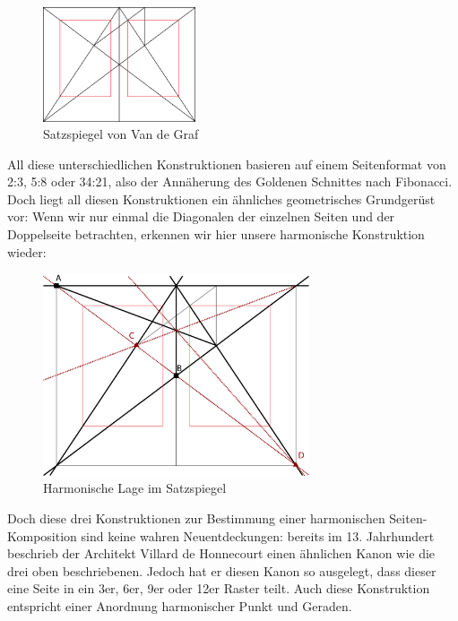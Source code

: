 \documentclass[12pt,a4paper]{article}
\begin{document}
\begin{figure}
\vspace{-0.04\textheight}
\includegraphics[width=0.4\textwidth]{Bilder/Van_de_Graaf_1.png}
\caption{Satzspiegel von Van de Graf}
\label{fig:VDG}
\end{figure}

All diese unterschiedlichen Konstruktionen basieren auf einem Seitenformat von 2:3, 5:8 oder 34:21, also der Annäherung des Goldenen Schnittes nach Fibonacci. Doch liegt all diesen Konstruktionen ein ähnliches geometrisches Grundgerüst vor: Wenn wir nur einmal die Diagonalen der einzelnen Seiten und der Doppelseite betrachten, erkennen wir hier unsere harmonische Konstruktion wieder:

\begin{figure}[htbp]
\centering
\includegraphics[width=0.7\textwidth]{Bilder/Van_de_Graaf.png}
\caption{Harmonische Lage im Satzspiegel}
\label{fig:harmVDG}
\end{figure}

Doch diese drei Konstruktionen zur Bestimmung einer harmonischen Seiten-Komposition sind keine wahren Neuentdeckungen: bereits im 13. Jahrhundert beschrieb der Architekt Villard de Honnecourt einen ähnlichen Kanon wie die drei oben beschriebenen. Jedoch hat er diesen Kanon so ausgelegt, dass dieser eine Seite in ein 3er, 6er, 9er oder 12er Raster teilt. Auch diese Konstruktion entspricht einer Anordnung harmonischer Punkt und Geraden. %
\end{document}
